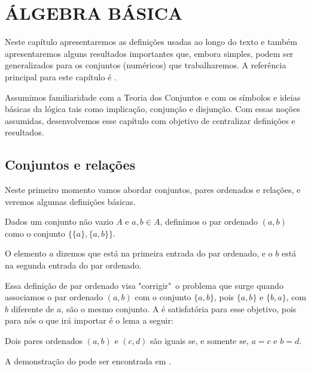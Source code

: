 \documentclass[../main.tex]{subfiles}
\begin{document}
\chapter{ÁLGEBRA BÁSICA}

Neste capítulo apresentaremos as definições usadas ao longo do texto e também apresentaremos alguns resultados importantes que, embora simples, podem ser generalizados para os conjuntos (numéricos) que trabalharemos. A referência principal para este capítulo é \textcite{domingues-iezzi-2018}. 

Assumimos familiaridade com a Teoria dos Conjuntos e com os símbolos e ideias básicas da lógica tais como implicação, conjunção e disjunção. Com essas noções assumidas, desenvolvemos esse capítulo com objetivo de centralizar definições e resultados.


\section{Conjuntos e relações}
Neste primeiro momento vamos abordar conjuntos, pares ordenados e relações, e veremos algumas definições básicas.

\begin{defi}\label{agb-def-parOrdenado}
     Dados um conjunto não vazio $A$ e $a,b \in A$, definimos o par ordenado $(a,b)$ como o conjunto $\{\{a\}, \{a,b\}\}$.
\end{defi}
    O elemento $a$ dizemos que está na primeira entrada do par ordenado, e o $b$ está na segunda entrada do par ordenado.
    
    Essa definição de par ordenado visa "corrigir"\ o problema que surge quando associamos o par ordenado $(a,b)$ com o conjunto $\{a,b\}$, pois  $\{a,b\}$ e $\{b,a\}$, com $b$ diferente de $a$, são o mesmo conjunto.
    A  é satisfatória para esse objetivo, pois para nós o que irá importar é o lema a seguir:

\begin{lema}\label{agb-lema-parOrdenado}
    Dois pares ordenados $(a,b)$ e $(c,d)$ são iguais se, e somente se, $a=c$ e $b=d$.
\end{lema}
A demonstração do  pode ser encontrada em \textcite[p. 42]{suppes}.
\end{document}
